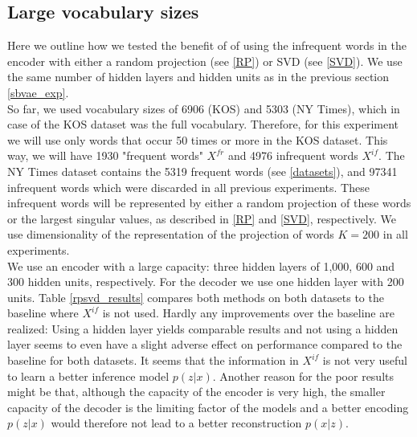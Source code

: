 \documentclass{report}
\begin{document}
	
	\subsection{Large vocabulary sizes}\label{large_voc_size}
	
	
	Here we outline how we tested the benefit of of using the infrequent words in the encoder with either a random projection (see \ref{RP}) or SVD (see \ref{SVD}). We use the same number of hidden layers and hidden units as in the previous section \ref{sbvae_exp}. \\
	So far, we used vocabulary sizes of 6906 (KOS) and 5303 (NY Times), which in case of the KOS dataset was the full vocabulary. Therefore, for this experiment we will use only words that occur 50 times or more in the KOS dataset. This way, we will have 1930 "frequent words" $X^{fr}$ and 4976 infrequent words $X^{if}$. The NY Times dataset contains the 5319 frequent words (see \ref{datasets}), and 97341 infrequent words which were discarded in all previous experiments. These infrequent words will be represented by either a random projection of these words or the largest singular values, as described in \ref{RP} and \ref{SVD}, respectively. We use dimensionality of the representation of the projection of words $K = 200$ in all experiments. \\
	We use an encoder with a large capacity: three hidden layers of 1,000, 600 and 300 hidden units, respectively. For the decoder we use one hidden layer with 200 units.
	Table \ref{rpsvd_results} compares both methods on both datasets to the baseline where $X^{if}$ is not used. Hardly any improvements over the baseline are realized: Using a hidden layer yields comparable results and not using a hidden layer seems to even have a slight adverse effect on performance compared to the baseline for both datasets. It seems that the information in $X^{if}$ is not very useful to learn a better inference model $p(z|x)$. Another  reason for the poor results might be that, although the capacity of the encoder is very high, the smaller capacity of the decoder is the limiting factor of the models and a better encoding $p(z|x)$ would therefore not lead to a better reconstruction $p(x|z)$.
	
\end{document}

